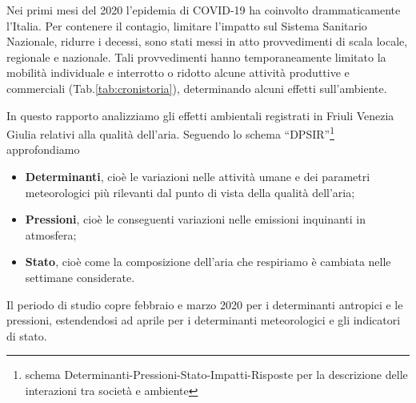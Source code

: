 Nei primi mesi del 2020 l'epidemia di COVID-19 ha coinvolto drammaticamente l'Italia. Per contenere il contagio, limitare l'impatto sul Sistema Sanitario Nazionale, ridurre i decessi, sono stati messi in atto provvedimenti di scala locale, regionale e nazionale. Tali provvedimenti hanno temporaneamente limitato la mobilità individuale e interrotto o ridotto alcune attività produttive e commerciali (Tab.\ref{tab:cronistoria}), determinando alcuni effetti sull'ambiente.

In questo rapporto analizziamo gli effetti ambientali registrati in Friuli Venezia Giulia relativi alla qualità dell'aria. Seguendo lo schema ``DPSIR''\footnote{schema Determinanti-Pressioni-Stato-Impatti-Risposte per la descrizione delle interazioni tra società e ambiente} approfondiamo 
\begin{itemize}
    \item \textbf{Determinanti}, cioè le variazioni nelle attività umane e dei parametri meteorologici più rilevanti dal punto di vista della qualità dell'aria;
    \item \textbf{Pressioni}, cioè le conseguenti variazioni nelle emissioni inquinanti in atmosfera;
    \item \textbf{Stato}, cioè come la composizione dell'aria che respiriamo è cambiata nelle settimane considerate.
\end{itemize}

Il periodo di studio copre febbraio e marzo 2020 per i determinanti antropici e le pressioni, estendendosi ad aprile per i determinanti meteorologici e gli indicatori di stato.

